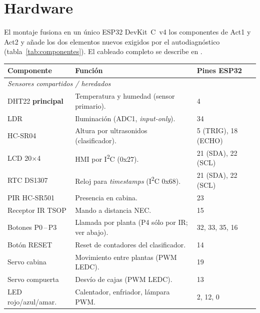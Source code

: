 \section{Hardware}
\label{sec:hardware}

El montaje fusiona en un único ESP32 DevKit~C~v4 los componentes de Act1 y
Act2 y añade los dos elementos nuevos exigidos por el autodiagnóstico
(tabla~\ref{tab:componentes}). El cableado completo se describe en
.

\begin{table}[H]
  \centering
  \small
  \begin{tabular}{p{} p{} p{}}
    \toprule
    \textbf{Componente} & \textbf{Función} & \textbf{Pines ESP32} \\
    \midrule
    \multicolumn{3}{l}{\emph{Sensores compartidos / heredados}}\\
    DHT22 \textbf{principal} & Temperatura y humedad (sensor primario). & 4 \\
    LDR                  & Iluminación (ADC1, \emph{input-only}).         & 34 \\
    HC-SR04              & Altura por ultrasonidos (clasificador).        & 5 (TRIG), 18 (ECHO) \\
    LCD 20$\times$4      & HMI por I\textsuperscript{2}C (0x27).          & 21 (SDA), 22 (SCL) \\
    RTC DS1307           & Reloj para \emph{timestamps} (I\textsuperscript{2}C 0x68). & 21 (SDA), 22 (SCL) \\
    PIR HC-SR501         & Presencia en cabina.                           & 23 \\
    Receptor IR TSOP     & Mando a distancia NEC.                         & 15 \\
    Botones P0\,--\,P3   & Llamada por planta (P4 sólo por IR; ver abajo).& 32, 33, 35, 16 \\
    Botón RESET          & Reset de contadores del clasificador.          & 14 \\
    Servo cabina         & Movimiento entre plantas (PWM LEDC).           & 19 \\
    Servo compuerta      & Desvío de cajas (PWM LEDC).                    & 13 \\
    LED rojo/azul/amar.  & Calentador, enfriador, lámpara PWM.            & 2, 12, 0 \\

\end{tabular}
\end{table}
